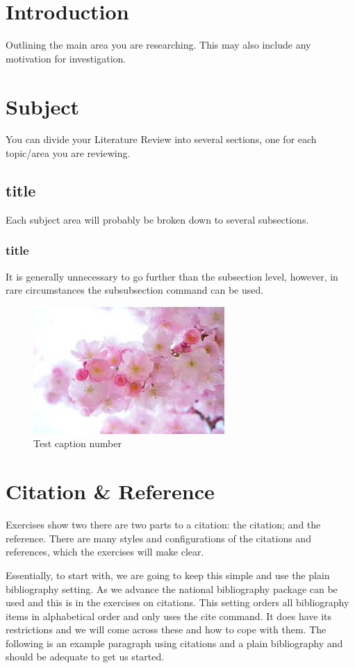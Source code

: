 \section{Introduction}
Outlining the main area you are researching. This may also include any motivation for investigation.
\section{Subject}
You can divide your Literature Review into several sections, one for each topic/area you are reviewing.
\subsection{title}
Each subject area will probably be broken down to several subsections.
\subsubsection{title}
It is generally unnecessary to go further than the subsection level, however, in rare circumstances the subsubsection command can be used. 


\begin{figure}
	\centering
	\includegraphics[scale=0.5]{ch2/blossom}
	\caption{Test caption number}
\end{figure}

\section{Citation \& Reference}
Exercises show two there are two parts to a citation: the citation; and the reference. There are many styles and configurations of the citations and references, which the exercises will make clear. 

Essentially, to start with, we are going to keep this simple and use the plain bibliography setting. As we advance the national bibliography package can be used and this is in the exercises on citations. This setting orders all bibliography items in alphabetical order and only uses the cite command. It does have its restrictions and we will come across these and how to cope with them. The following is an example paragraph using citations and a plain bibliography and should be adequate to get us started.


